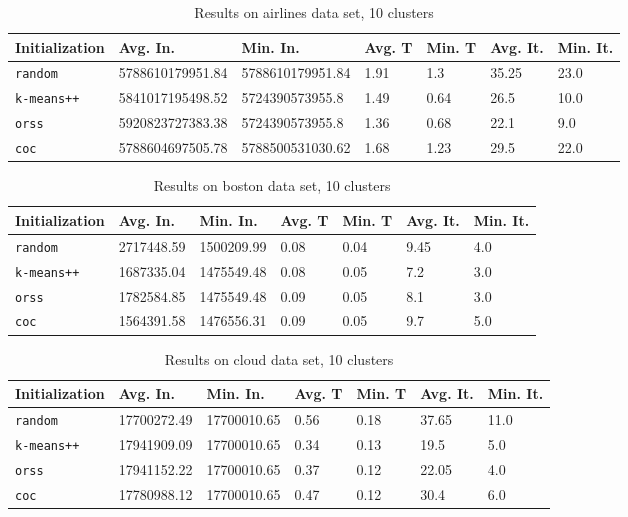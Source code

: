 \begin{table}[p]
	\begin{center}
		\begin{tabular}{|l|l|l|l|l|l|l|}
			\hline
			Initialization & Avg. In. & Min. In. & Avg. T & Min. T & Avg. It. & Min. It.\\\hline
			\texttt{random} & 5788610179951.84 & 5788610179951.84 & 1.91 & 1.3 & 35.25 & 23.0\\\hline
			\texttt{k-means++} & 5841017195498.52 & 5724390573955.8 & 1.49 & 0.64 & 26.5 & 10.0\\\hline
			\texttt{orss} & 5920823727383.38 & 5724390573955.8 & 1.36 & 0.68 & 22.1 & 9.0\\\hline
			\texttt{coc} & 5788604697505.78 & 5788500531030.62 & 1.68 & 1.23 & 29.5 & 22.0\\\hline
		\end{tabular}
		\caption{Results on airlines data set, 10 clusters}
		\label{tbl:airlines10}
	\end{center}
\end{table}

\begin{table}[p]
	\begin{center}
		\begin{tabular}{|l|l|l|l|l|l|l|}
			\hline
			Initialization & Avg. In. & Min. In. & Avg. T & Min. T & Avg. It. & Min. It.\\\hline
			\texttt{random} & 2717448.59 & 1500209.99 & 0.08 & 0.04 & 9.45 & 4.0\\\hline
			\texttt{k-means++} & 1687335.04 & 1475549.48 & 0.08 & 0.05 & 7.2 & 3.0\\\hline
			\texttt{orss} & 1782584.85 & 1475549.48 & 0.09 & 0.05 & 8.1 & 3.0\\\hline
			\texttt{coc} & 1564391.58 & 1476556.31 & 0.09 & 0.05 & 9.7 & 5.0\\\hline
		\end{tabular}
		\caption{Results on boston data set, 10 clusters}
		\label{tbl:boston10}
	\end{center}
\end{table}

\begin{table}[p]
	\begin{center}
		\begin{tabular}{|l|l|l|l|l|l|l|}
			\hline
			Initialization & Avg. In. & Min. In. & Avg. T & Min. T & Avg. It. & Min. It.\\\hline
			\texttt{random} & 17700272.49 & 17700010.65 & 0.56 & 0.18 & 37.65 & 11.0\\\hline
			\texttt{k-means++} & 17941909.09 & 17700010.65 & 0.34 & 0.13 & 19.5 & 5.0\\\hline
			\texttt{orss} & 17941152.22 & 17700010.65 & 0.37 & 0.12 & 22.05 & 4.0\\\hline
			\texttt{coc} & 17780988.12 & 17700010.65 & 0.47 & 0.12 & 30.4 & 6.0\\\hline
		\end{tabular}
		\caption{Results on cloud data set, 10 clusters}
		\label{tbl:cloud10}
	\end{center}
\end{table}

